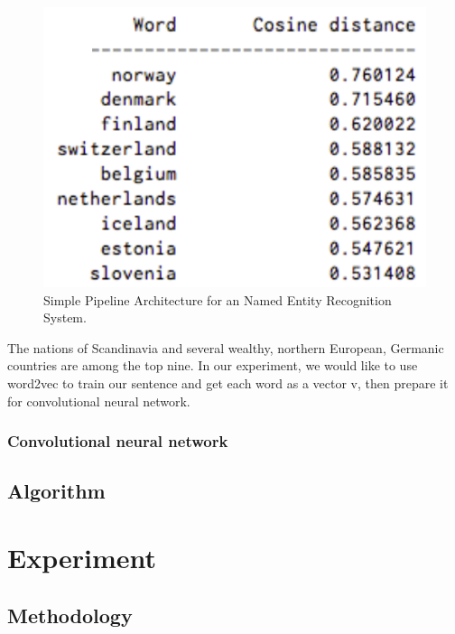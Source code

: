 \documentclass[10pt,twocolumn,letterpaper]{article}
\begin{document}
\begin{figure}
\includegraphics[width=\linewidth]{word2vec}
\caption{Simple Pipeline Architecture for an Named Entity Recognition System. }
\label{fig:word2vec}
\end{figure}
The nations of Scandinavia and several wealthy, northern European, Germanic countries are among the top nine. \cite{bahrampour2015comparative}
In our experiment, we would like to use word2vec to train our sentence and get each word as a vector v, then prepare it for convolutional neural network.

\subsubsection{Convolutional neural network}




\subsection{Algorithm}



\section{Experiment}
\subsection{Methodology}
\end{document}
